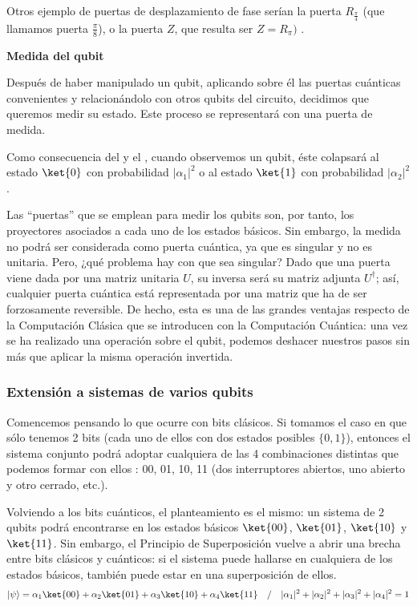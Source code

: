 \documentclass[11pt,a4paper,twoside,pdf]{article}
\numberwithin{equation}{section}
\begin{document}
			Otros ejemplo de puertas de desplazamiento de fase serían la puerta $R_{\frac{\pi}{4}}$ (que llamamos puerta $\frac{\pi}{8}$), o la puerta $Z$, que resulta ser $Z=R_{\pi})$ .	
			
		\begin{flushleft}{\textbf{Medida del qubit }}\end{flushleft}	
		
			Después de haber manipulado un qubit, aplicando sobre él las puertas cuánticas convenientes y relacionándolo con otros qubits del circuito, decidimos que queremos medir su estado. Este proceso se representará con una puerta de medida. 	
				
			Como consecuencia del  y el , cuando observemos un qubit, éste colapsará al estado $\ket{0}$ con probabilidad $|\alpha_1|^2$ o al estado $\ket{1}$ con probabilidad $|\alpha_2|^2$.
			
			Las ``puertas'' que se emplean para medir los qubits son, por tanto, los proyectores asociados a cada uno de los estados básicos.
			Sin embargo, la medida no podrá ser considerada como puerta cuántica, ya que es singular y no es unitaria. Pero, ¿qué problema hay con que sea singular?
			Dado que una puerta viene dada por una matriz unitaria $U$, su inversa será su matriz adjunta $U^{\dagger}$; así, cualquier puerta cuántica está representada por una matriz que ha de ser forzosamente reversible. De hecho, esta es una de las grandes ventajas respecto de la Computación Clásica que se introducen con la Computación Cuántica: una vez se ha realizado una operación sobre el qubit, podemos deshacer nuestros pasos sin más que aplicar la misma operación invertida.
			
	
				
		\subsubsection{Extensión a sistemas de varios qubits}
		
		Comencemos pensando lo que ocurre con bits clásicos. Si tomamos el caso en que sólo tenemos 2 bits (cada uno de ellos con dos estados posibles $\{0,1\}$), entonces el sistema conjunto podrá adoptar cualquiera de las 4 combinaciones distintas que podemos formar con ellos : 00, 01, 10, 11 (dos interruptores abiertos, uno abierto y otro cerrado, etc.).
		
		Volviendo a los bits cuánticos, el planteamiento es el mismo: un sistema de 2 qubits podrá encontrarse en los estados básicos $\ket{00}$, $\ket{01}$, $\ket{10}$ y $\ket{11}$. Sin embargo, el Principio de Superposición vuelve a abrir una brecha entre bits clásicos y cuánticos: si el sistema puede hallarse en cualquiera de los estados básicos, también puede estar en una superposición de ellos.
			\begin{equation} \label{eq: Superposicion2}\notag
				|\psi\rangle = \alpha_1 \ket{00} + \alpha_2 \ket{01} + \alpha_3 \ket{10} + \alpha_4 \ket{11} \quad / \quad |\alpha_1|^2+|\alpha_2|^2+|\alpha_3|^2+|\alpha_4|^2=1					
			\end{equation}
				
\end{document}
